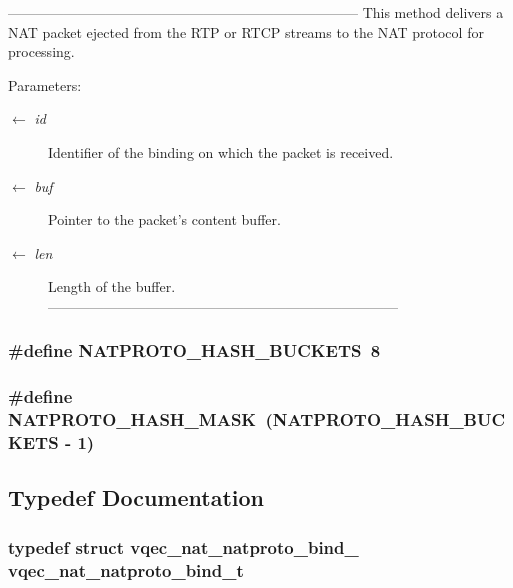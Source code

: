 --------------------------------------------------------------------------- This method delivers a NAT packet ejected from the RTP or RTCP streams to the NAT protocol for processing.

\begin{Desc}
\item[Parameters:]
\begin{description}
\item[\mbox{$\leftarrow$} {\em id}]Identifier of the binding on which the packet is received. \item[\mbox{$\leftarrow$} {\em buf}]Pointer to the packet's content buffer. \item[\mbox{$\leftarrow$} {\em len}]Length of the buffer. --------------------------------------------------------------------------- \end{description}
\end{Desc}
\subsubsection{\setlength{\rightskip}{0pt plus 5cm}\#define NATPROTO\_\-HASH\_\-BUCKETS~8}\label{vqec__nat__natproto_8c_71c9d20f2b90f18f899261d94e771f57}


\subsubsection{\setlength{\rightskip}{0pt plus 5cm}\#define NATPROTO\_\-HASH\_\-MASK~(NATPROTO\_\-HASH\_\-BUCKETS - 1)}\label{vqec__nat__natproto_8c_b468ed777a6128578c09b4609e6944f0}




\subsection{Typedef Documentation}
\subsubsection{\setlength{\rightskip}{0pt plus 5cm}typedef struct \bf{vqec\_\-nat\_\-natproto\_\-bind\_\-}  \bf{vqec\_\-nat\_\-natproto\_\-bind\_\-t}}\label{vqec__nat__natproto_8c_7b00f50d7b059b7a510eb246a6614ca6}


